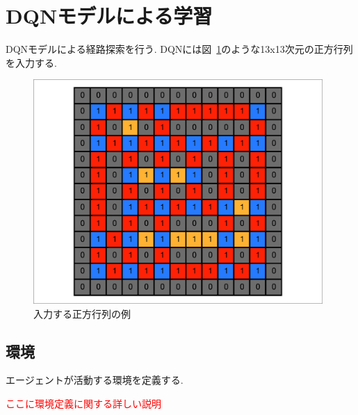 \section{DQNモデルによる学習}

DQNモデルによる経路探索を行う. DQNには図~\ref{ll_tensor}のような13x13次元の正方行列を入力する.


\begin{figure}[H]
    \centering  %
    \includegraphics[clip,width = 11.0cm]{assets/MAP_6.eps}
    \caption{入力する正方行列の例} \label{ll_tensor}
\end{figure}
  

\subsection{環境}

エージェントが活動する環境を定義する.

\textcolor{red}{ここに環境定義に関する詳しい説明}

